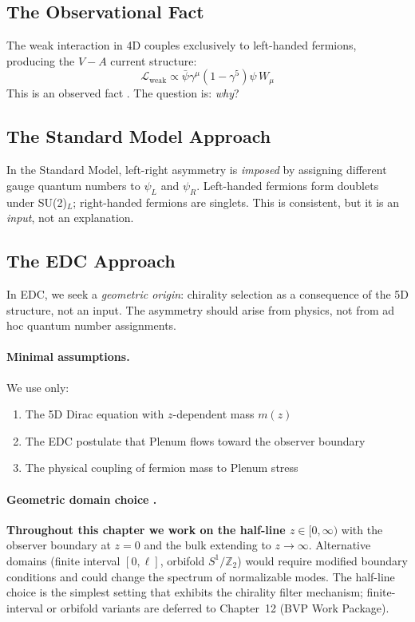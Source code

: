 \subsection{The Observational Fact}

The weak interaction in 4D couples exclusively to left-handed fermions,
producing the $V{-}A$ current structure:
\begin{equation}
    \mathcal{L}_{\text{weak}} \propto \bar\psi \gamma^\mu (1 - \gamma^5) \psi \, W_\mu
    \label{eq:ch9_va_current}
\end{equation}
This is an observed fact \tagBL{}. The question is: \emph{why}?

\subsection{The Standard Model Approach}

In the Standard Model, left-right asymmetry is \emph{imposed} by assigning
different gauge quantum numbers to $\psi_L$ and $\psi_R$. Left-handed fermions
form doublets under SU(2)$_L$; right-handed fermions are singlets. This is
consistent, but it is an \emph{input}, not an explanation.

\subsection{The EDC Approach}

In EDC, we seek a \emph{geometric origin}: chirality selection as a consequence
of the 5D structure, not an input. The asymmetry should arise from physics,
not from ad hoc quantum number assignments.

\paragraph{Minimal assumptions.}
We use only:
\begin{enumerate}[nosep]
    \item The 5D Dirac equation with $z$-dependent mass $m(z)$ \tagBL{}
    \item The EDC postulate that Plenum flows toward the observer boundary \tagP{}
    \item The physical coupling of fermion mass to Plenum stress \tagP{}
\end{enumerate}

\paragraph{Geometric domain choice \tagP{}.}
\textbf{Throughout this chapter we work on the half-line $z \in [0, \infty)$} with
the observer boundary at $z = 0$ and the bulk extending to $z \to \infty$.
Alternative domains (finite interval $[0, \ell]$, orbifold $S^1/\mathbb{Z}_2$)
would require modified boundary conditions and could change the spectrum of
normalizable modes. The half-line choice is the simplest setting that exhibits
the chirality filter mechanism; finite-interval or orbifold variants are
deferred to Chapter~12 (BVP Work Package).

